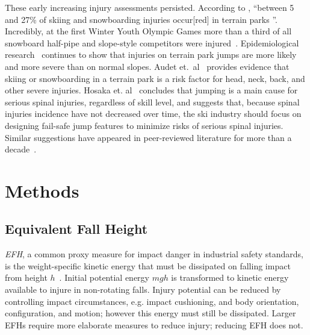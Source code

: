 \documentclass[smallextended]{svjour3}       %
\begin{document}
These early increasing injury assessments persisted. According to
\cite{Russell2014}, ``between 5 and 27\% of skiing and snowboarding injuries
occur[red] in terrain parks
\cite{Bridges2003,Goulet2007,Moffat2009,Greve2009,Brooks2010,Ruedl2013}''.
Incredibly, at the first Winter Youth Olympic Games more than a third of all
snowboard half-pipe and slope-style competitors were injured~\cite{Ruedl2012}.
Epidemiological research~\cite{Carus2016,Audet2020,Hosaka2020} continues to
show that injuries on terrain park jumps are more likely and more severe than
on normal slopes. Audet et.~al~\cite{Audet2020} provides evidence that skiing
or snowboarding in a terrain park is a risk factor for head, neck, back, and
other severe injuries. Hosaka et. al~\cite{Hosaka2020} concludes that jumping
is a main cause for serious spinal injuries, regardless of skill level, and
suggests that, because spinal injuries incidence  have not decreased over time,
the ski industry should focus on designing fail-safe jump features to minimize
risks of serious spinal injuries. Similar suggestions have appeared in
peer-reviewed literature for more than a
decade~\cite{Hubbard2009,Swedberg2012,Hubbard2012,McNeil2012,McNeil2012a,Hubbard2015,Levy2015,Petrone2017,Moore2018}.

\section{Methods}
\subsection{Equivalent Fall Height}
\label{sec:efh}
%
\emph{EFH}, a common proxy measure for impact danger in industrial safety
standards, is the weight-specific kinetic energy that must be dissipated on
falling impact from height $h$~\cite{Muller1995,Hubbard2009,Gasser2018}.
Initial potential energy $mgh$ is transformed to kinetic energy available to
injure in non-rotating falls. Injury potential can be reduced by controlling
impact circumstances, e.g. impact cushioning, and body orientation,
configuration, and motion; however this energy must still be dissipated. Larger
EFHs require more elaborate measures to reduce injury; reducing EFH does not.
\end{document}
